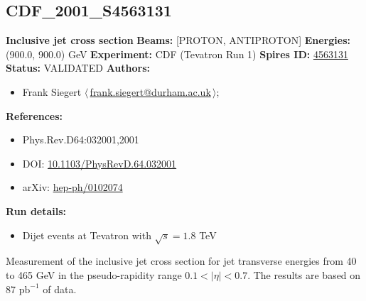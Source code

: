 \subsection[CDF\_2001\_S4563131]{CDF\_2001\_S4563131\,\cite{Affolder:2001fa}}
\textbf{Inclusive jet cross section}\newline
\textbf{Beams:} [PROTON, ANTIPROTON] \newline
\textbf{Energies:} (900.0, 900.0) GeV \newline
\textbf{Experiment:} CDF (Tevatron Run 1) \newline
\textbf{Spires ID:} \href{http://www.slac.stanford.edu/spires/find/hep/www?rawcmd=key+4563131}{4563131}\newline
\textbf{Status:} VALIDATED\newline
\textbf{Authors:}
\begin{itemize}
  \item Frank Siegert $\langle\,$\href{mailto:frank.siegert@durham.ac.uk}{frank.siegert@durham.ac.uk}$\,\rangle$;
\end{itemize}
\textbf{References:}
\begin{itemize}
  \item Phys.Rev.D64:032001,2001
  \item DOI: \href{http://dx.doi.org/10.1103/PhysRevD.64.032001}{10.1103/PhysRevD.64.032001}
  \item arXiv: \href{http://arxiv.org/abs/hep-ph/0102074}{hep-ph/0102074}
\end{itemize}
\textbf{Run details:}
\begin{itemize}

  \item Dijet events at Tevatron with $\sqrt{s}=1.8$ TeV\end{itemize}

\noindent Measurement of the inclusive jet cross section for jet transverse energies from 40 to 465 GeV in the pseudo-rapidity range $0.1<|\eta|<0.7$. The results are based on 87 $\mathrm{pb}^{-1}$ of data.

\clearpage


\clearpage

